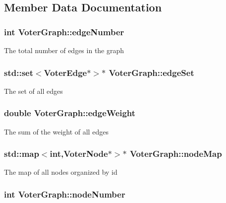 \subsection{Member Data Documentation}
\hypertarget{classVoterGraph_a6840594abf9c606b4ac8c7cac88cdf9b}{
\subsubsection[{edge\-Number}]{\setlength{\rightskip}{0pt plus 5cm}int Voter\-Graph\-::edge\-Number}}\label{classVoterGraph_a6840594abf9c606b4ac8c7cac88cdf9b}
The total number of edges in the graph \hypertarget{classVoterGraph_a712b0ec4b780579721b7b6bca8fd409e}{
\subsubsection[{edge\-Set}]{\setlength{\rightskip}{0pt plus 5cm}std\-::set$<${\bf Voter\-Edge}$\ast$$>$$\ast$ Voter\-Graph\-::edge\-Set}}\label{classVoterGraph_a712b0ec4b780579721b7b6bca8fd409e}
The set of all edges \hypertarget{classVoterGraph_a33dc5727bd80818f0d4e89c17303d7c8}{
\subsubsection[{edge\-Weight}]{\setlength{\rightskip}{0pt plus 5cm}double Voter\-Graph\-::edge\-Weight}}\label{classVoterGraph_a33dc5727bd80818f0d4e89c17303d7c8}
The sum of the weight of all edges \hypertarget{classVoterGraph_a73838569fae5c5c96efadb1f121f5a90}{
\subsubsection[{node\-Map}]{\setlength{\rightskip}{0pt plus 5cm}std\-::map$<$int,{\bf Voter\-Node}$\ast$$>$$\ast$ Voter\-Graph\-::node\-Map}}\label{classVoterGraph_a73838569fae5c5c96efadb1f121f5a90}
The map of all nodes organized by id \hypertarget{classVoterGraph_a7557cf918e298cf5d5558f7323fe8f35}{
\subsubsection[{node\-Number}]{\setlength{\rightskip}{0pt plus 5cm}int Voter\-Graph\-::node\-Number}}\label{classVoterGraph_a7557cf918e298cf5d5558f7323fe8f35}
